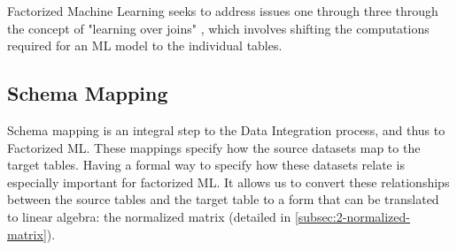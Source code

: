 Factorized Machine Learning seeks to address issues one through three through the concept of "learning over joins" \cite{orion_learning_gen_lin_models}, which involves shifting the computations required for an ML model to the individual tables.

\subsection{Schema Mapping}
Schema mapping is an integral step to the Data Integration process, and thus to Factorized ML. These mappings specify how the source datasets map to the target tables. Having a formal way to specify how these datasets relate is especially important for factorized ML. It allows us to convert these relationships between the source tables and the target table to a form that can be translated to linear algebra: the normalized matrix (detailed in \autoref{subsec:2-normalized-matrix}).

